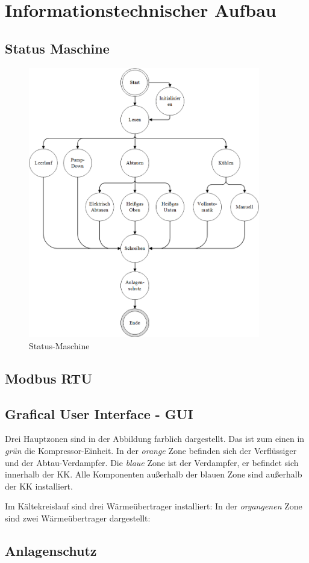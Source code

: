 \section{Informationstechnischer Aufbau}
\label{sec:Informationstechnischer Aufbau}

\subsection{Status Maschine}
\label{subsec:Status Maschine}

\begin{figure}[htb]
\centering		\includegraphics[width=0.90\textwidth]{Pictures/SM.png}
\caption{Status-Maschine}
\label{fig:SM}
\end{figure}

\subsection{Modbus RTU}
\label{subsec:Modbus RTU}

\subsection{Grafical User Interface - GUI}
\label{subsec:GUI}


Drei Hauptzonen sind in der Abbildung farblich dargestellt. Das ist zum einen in \textit{grün} die Kompressor-Einheit. In der \textit{orange} Zone befinden sich der Verflüssiger und der Abtau-Verdampfer. Die \textit{blaue} Zone ist der Verdampfer, er befindet sich innerhalb der KK. Alle Komponenten außerhalb der blauen Zone sind außerhalb der KK installiert. 

 Im Kältekreislauf sind drei Wärmeübertrager installiert: In der \textit{organgenen} Zone sind zwei Wärmeübertrager dargestellt:

\subsection{Anlagenschutz}
\label{subsec: Anlagenschutz}
